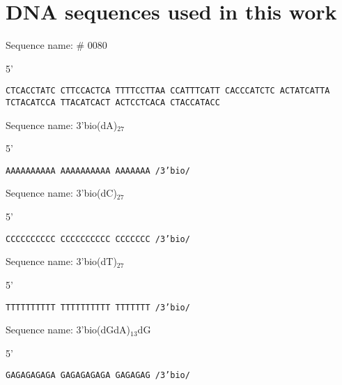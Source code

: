 \chapter{DNA sequences used in this work}
\label{sequences}

{\setlength{\parindent}{0cm}
Sequence name: \# 0080

5'

\texttt{CTCACCTATC CTTCCACTCA TTTTCCTTAA CCATTTCATT CACCCATCTC ACTATCATTA TCTACATCCA TTACATCACT ACTCCTCACA CTACCATACC}


Sequence name: 3'bio(dA)$_{27}$

5'

\texttt{AAAAAAAAAA AAAAAAAAAA AAAAAAA /3'bio/}


Sequence name: 3'bio(dC)$_{27}$

5'

\texttt{CCCCCCCCCC CCCCCCCCCC CCCCCCC /3'bio/}


Sequence name: 3'bio(dT)$_{27}$

5'

\texttt{TTTTTTTTTT TTTTTTTTTT TTTTTTT /3'bio/}


Sequence name: 3'bio(dGdA)$_{13}$dG

5'

\texttt{GAGAGAGAGA GAGAGAGAGA GAGAGAG /3'bio/}


}